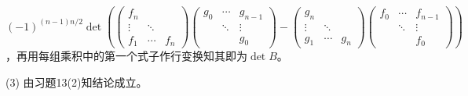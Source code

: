 \documentclass[a4paper,UTF8,fontset=windows]{ctexart}
\begin{document}
\begin{enumerate}
$(-1)^{(n-1)n/2}\det{\left(\begin{pmatrix}f_n&&\\\vdots&\ddots&\\f_1&\cdots&f_n\end{pmatrix}\begin{pmatrix}g_0&\cdots&g_{n-1}\\&\ddots&\vdots\\&&g_0\end{pmatrix}-\begin{pmatrix}g_n&&\\\vdots&\ddots&\\g_1&\cdots&g_n\end{pmatrix}\begin{pmatrix}f_0&\cdots&f_{n-1}\\&\ddots&\vdots\\&&f_0\end{pmatrix}\right)}$ ，再用每组乘积中的第一个式子作行变换知其即为$\det{B}$。

(3) 由习题13(2)知结论成立。
\end{enumerate}
\end{document}
